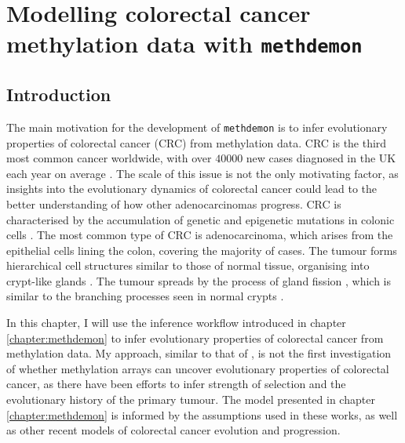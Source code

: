 \chapter{Modelling colorectal cancer methylation data with \texttt{methdemon}}
\label{chapter:methylation}


\section{Introduction}
The main motivation for the development of \texttt{methdemon} is to infer
evolutionary properties of colorectal cancer (CRC) from methylation data. CRC
is the third most common cancer worldwide, with over $40000$ new cases
diagnosed in the UK each year on average \cite{noauthor_bowel_2015}. The scale
of this issue is not the only motivating factor, as insights into the
evolutionary dynamics of colorectal cancer could lead to the better
understanding of how other adenocarcinomas progress. CRC is characterised by the
accumulation of genetic and epigenetic mutations in colonic cells
\cite{fleming_colorectal_2012}. The most common type of CRC is adenocarcinoma,
which arises from the epithelial cells lining the colon, covering the majority
of cases. The tumour forms hierarchical cell structures similar to those of
normal tissue, organising into crypt-like glands
\cite{ponz_de_leon_pathology_2001}. The tumour spreads by the process of gland
fission \cite{preston_bottom-up_nodate}, which is similar to the branching
processes seen in normal crypts \cite{almet_multicellular_2018}. \par
In this chapter, I will use the inference workflow introduced in chapter
\ref{chapter:methdemon} to infer evolutionary properties of colorectal cancer
from methylation data. My approach, similar to that of
\cite{gabbutt_fluctuating_2022, gabbutt_evolutionary_2023}, is not the first
investigation of whether methylation arrays can uncover evolutionary properties
of colorectal cancer, as there have been efforts to infer strength of selection
\cite{siegmund_high_2011} and the evolutionary history \cite{hong_using_2010} of
the primary tumour. The model presented in chapter \ref{chapter:methdemon} is
informed by the assumptions used in these works, as well as other recent models
of colorectal cancer evolution and progression.

